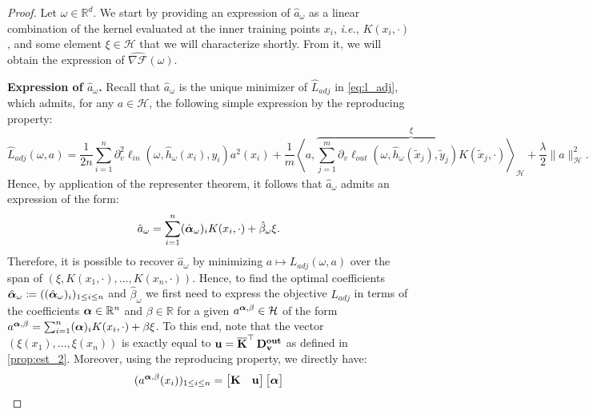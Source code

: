 \begin{proof}
{Let $\omega\in\mathbb{R}^d$.} We start by providing an expression of $\hat{a}_{\omega}$ as a linear combination of the kernel evaluated at the inner training points $x_i$, \textit{i.e.}, $K(x_i,\cdot)$, and some element  $\xi\in \mathcal{H}$ that we will characterize shortly. From it, we will obtain the expression of $\widehat{\nabla\mathcal{F}}(\omega)$. 

{\bf Expression of $\hat{a}_{\omega}$.}
Recall that $\hat{a}_{\omega}$ is the unique minimizer of $\widehat{L}_{adj}$ in \cref{eq:l_adj}, which admits{, for any $a\in\mathcal{H}$,} the following  simple expression by the reproducing property:
 \begin{equation*}    \widehat{L}_{adj}(\omega, a)=\frac{1}{2n}\sum_{i=1}^n\partial_v^2 \ell_{in}(\omega, \hat{h}_\omega(x_i), y_i)a^2(x_i)+\frac{1}{m}\left\langle a, \overbrace{\sum_{j=1}^m\partial_v\ell_{out}(\omega, \hat{h}_\omega(\tilde{x}_j), \tilde{y}_j)K(\tilde{x}_j,\cdot)}^{\xi}\right\rangle_{\mathcal{H}}+\frac{\lambda}{2}\|a\|_\mathcal{H}^2.
\end{equation*}
 Hence, by application of the representer theorem, it follows that $\hat{a}_{\omega}$ admits an expression of the form:
 \begin{align}\label{eq:a}
 	\hat{a}_{\omega} = \sum_{i=1}^n (\hat{\operatorname{\boldsymbol{\alpha}}}_{\omega})_i K(x_i,\cdot) + \hat{\beta}_{\omega}{\xi}. 
 \end{align}
Therefore, it is possible to recover $\hat{a}_{\omega}$ by minimizing $a\mapsto L_{adj}(\omega,a)$ over the span of $(\xi, K(x_1,\cdot),\ldots,K(x_n,\cdot))$. Hence, to find the optimal coefficients $\hat{\operatorname{\boldsymbol{\alpha}}}_{\omega}\coloneqq ((\hat{\operatorname{\boldsymbol{\alpha}}}_{\omega})_{i})_{1\leq i \leq n}$ and  $\hat{\beta}_{\omega}$ we first need to express the objective $L_{adj}$ in terms of the coefficients $\operatorname{\boldsymbol{\alpha}} \in \mathbb{R}^n$ and $\beta\in \mathbb{R}$ for a given $a^{\operatorname{\boldsymbol{\alpha}},\beta}\in \mathcal{H}$ of the form $a^{\operatorname{\boldsymbol{\alpha}},\beta} = \sum_{i=1}^n (\operatorname{\boldsymbol{\alpha}})_i K(x_i,\cdot) + \beta \xi$. To this end, note that the vector $(\xi(x_1),\ldots,\xi(x_n))$ is exactly equal to $\mathbf{u}= \operatorname{\mathbf{\overline{K}}}^\top\operatorname{\mathbf{D_v^{out}}}$ as defined in \cref{prop:est_2}. Moreover, using the reproducing property, we directly have:
\begin{align*}
	(a^{\operatorname{\boldsymbol{\alpha}},\beta}(x_i))_{1\leq i\leq n} = \begin{bmatrix}
        \operatorname{\mathbf{K}} & 
        \mathbf{u}
    \end{bmatrix}
 \begin{bmatrix}
        \operatorname{\boldsymbol{\alpha}}\\

\end{bmatrix}
\end{align*}
\end{proof}
